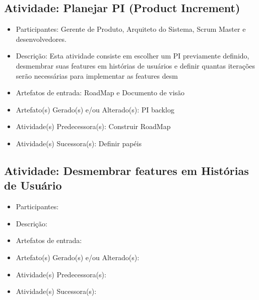 \subsection{Atividade: Planejar PI (Product Increment)}
\begin{itemize}
\item Participantes: Gerente de Produto, Arquiteto do Sistema, Scrum Master e desenvolvedores.

\item Descrição: Esta atividade consiste em escolher um PI previamente definido, desmembrar suas features em histórias de usuários e definir quantas iterações serão necessárias para implementar as features desm

\item Artefatos de entrada: RoadMap e Documento de visão

\item Artefato(s) Gerado(s) e/ou Alterado(s): PI backlog

\item Atividade(s) Predecessora(s): Construir RoadMap
  
\item Atividade(s) Sucessora(s): Definir papéis
\end{itemize}



\subsection{Atividade: Desmembrar features em Histórias de Usuário}
\begin{itemize}
\item Participantes: 

\item Descrição: 

\item Artefatos de entrada: 

\item Artefato(s) Gerado(s) e/ou Alterado(s): 

\item Atividade(s) Predecessora(s): 
  
\item Atividade(s) Sucessora(s): 
\end{itemize}

